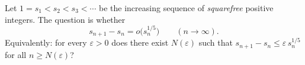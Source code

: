 Let $1=s_1<s_2<s_3<\cdots$ be the increasing sequence of \emph{squarefree} positive integers.
The question is whether
\[
 s_{n+1}-s_n = o\bigl(s_n^{1/5}\bigr)\qquad (n\to\infty).
\]
Equivalently: for every $\varepsilon>0$ does there exist $N(\varepsilon)$ such that
$s_{n+1}-s_n \le \varepsilon\, s_n^{1/5}$ for all $n\ge N(\varepsilon)$?
